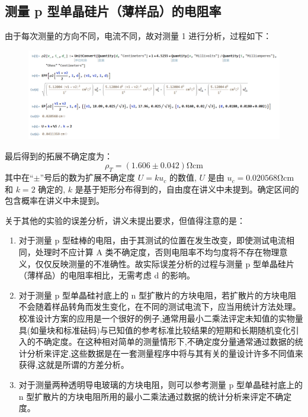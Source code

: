 \documentclass[a4paper,utf8]{article}
\begin{document}
    \subsection{测量 p 型单晶硅片（薄样品）的电阻率}
        由于每次测量的方向不同，电流不同，故对测量 1 进行分析，过程如下：\par
        \begin{figure}[!ht]\centering
            \includegraphics[width=150mm]{result.png}
        \end{figure}
        最后得到的拓展不确定度为：
        \begin{equation*}
            \rho_T = ( 1.606 \pm 0.042 ) \unit{\ohm\cm}
        \end{equation*}
        其中在“$\pm$”号后的数为扩展不确定度 $U=ku_c$ 的数值, $ U $ 是由 $ u_c= 0.020568 \unit{\ohm\cm}$ 和 $ k = 2 $ 确定的, $k$ 是基于矩形分布得到的，自由度在讲义中未提到。确定区间的包含概率在讲义中未提到。\par
        关于其他的实验的误差分析，讲义未提出要求，但值得注意的是：
        \begin{enumerate}
            \item 对于测量 p 型硅棒的电阻，由于其测试的位置在发生改变，即使测试电流相同，处理时不应计算 A 类不确定度，否则电阻率不均匀度将不存在物理意义，仅仅反映测量的不准确性。故实际误差分析的过程与测量 p 型单晶硅片（薄样品）的电阻率相比，无需考虑 d 的影响。
            \item 对于测量 p 型单晶硅衬底上的 n 型扩散片的方块电阻，若扩散片的方块电阻不会随着样品转角而发生变化，在不同的测试电流下，应当用统计方法处理。校准设计方案的应用是一个很好的例子,通常用最小二乘法评定未知值的实物量具(如量块和标准砝码)与已知值的参考标准比较结果的短期和长期随机变化引入的不确定度。在这种相对简单的测量情形下,不确定度分量通常通过数据的统计分析来评定,这些数据是在一套测量程序中将与其有关的量设计许多不同值来获得,这就是所谓的方差分析。
            \item 对于测量两种透明导电玻璃的方块电阻，则可以参考测量 p 型单晶硅衬底上的 n 型扩散片的方块电阻所用的最小二乘法通过数据的统计分析来评定不确定度。
        \end{enumerate}
\end{document}
